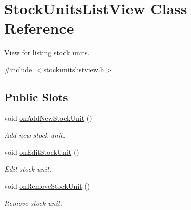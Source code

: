\hypertarget{class_stock_units_list_view}{\section{\-Stock\-Units\-List\-View \-Class \-Reference}
\label{class_stock_units_list_view}
}


\-View for listing stock units.  




{\ttfamily \#include $<$stockunitslistview.\-h$>$}

\subsection*{\-Public \-Slots}
\begin{DoxyCompactItemize}
\item 
void \hyperlink{class_stock_units_list_view_a3743e4bd26d15095c06ee740a6527530}{on\-Add\-New\-Stock\-Unit} ()
\begin{DoxyCompactList}\small\item\em \-Add new stock unit. \end{DoxyCompactList}\item 
void \hyperlink{class_stock_units_list_view_af10d28e215b9e7025ece3d736dfb4a87}{on\-Edit\-Stock\-Unit} ()
\begin{DoxyCompactList}\small\item\em \-Edit stock unit. \end{DoxyCompactList}\item 
void \hyperlink{class_stock_units_list_view_a595ab5aa6359269e1548e246ac82ae93}{on\-Remove\-Stock\-Unit} ()
\begin{DoxyCompactList}\small\item\em \-Remove stock unit. \end{DoxyCompactList}\end{DoxyCompactItemize}
